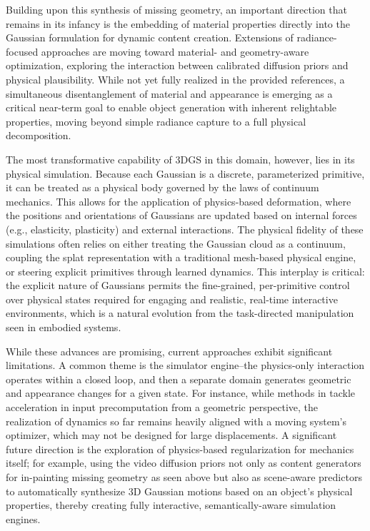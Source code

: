 \documentclass[11pt,a4paper]{article}
\begin{document}
Building upon this synthesis of missing geometry, an important direction that remains in its infancy is the embedding of material properties directly into the Gaussian formulation for dynamic content creation. Extensions of radiance-focused approaches are moving toward material- and geometry-aware optimization, exploring the interaction between calibrated diffusion priors and physical plausibility. While not yet fully realized in the provided references, a simultaneous disentanglement of material and appearance is emerging as a critical near-term goal to enable object generation with inherent relightable properties, moving beyond simple radiance capture to a full physical decomposition.

The most transformative capability of 3DGS in this domain, however, lies in its physical simulation. Because each Gaussian is a discrete, parameterized primitive, it can be treated as a physical body governed by the laws of continuum mechanics. This allows for the application of physics-based deformation, where the positions and orientations of Gaussians are updated based on internal forces (e.g., elasticity, plasticity) and external interactions. The physical fidelity of these simulations often relies on either treating the Gaussian cloud as a continuum, coupling the splat representation with a traditional mesh-based physical engine, or steering explicit primitives through learned dynamics. This interplay is critical: the explicit nature of Gaussians permits the fine-grained, per-primitive control over physical states required for engaging and realistic, real-time interactive environments, which is a natural evolution from the task-directed manipulation seen in embodied systems.

While these advances are promising, current approaches exhibit significant limitations. A common theme is the simulator engine--the physics-only interaction operates within a closed loop, and then a separate domain generates geometric and appearance changes for a given state. For instance, while methods in \cite{arxiv:2504.20378v1} tackle acceleration in input precomputation from a geometric perspective, the realization of dynamics so far remains heavily aligned with a moving system's optimizer, which may not be designed for large displacements. A significant future direction is the exploration of physics-based regularization for mechanics itself; for example, using the video diffusion priors not only as content generators for in-painting missing geometry as seen above but also as scene-aware predictors to automatically synthesize 3D Gaussian motions based on an object's physical properties, thereby creating fully interactive, semantically-aware simulation engines.
\end{document}
